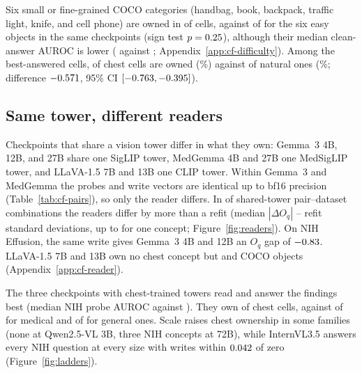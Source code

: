 Six small or fine-grained COCO categories (handbag, book, backpack, traffic light, knife, and cell phone) are owned in \cfFgFineOwned{} of \cfFgFineCells{} cells, against \cfFgEasySameOwned{} of \cfFgEasySameCells{} for the six easy objects in the same checkpoints (sign test $p=0.25$), although their median clean-answer AUROC is lower (\cfFgFineAuroc{} against \cfFgEasySameAuroc{}; Appendix~\ref{app:cf-difficulty}). Among the best-answered cells, \cfStratChestTopOwned{} of \cfStratChestTopN{} chest cells are owned (\cfStratChestTopPct\%) against \cfStratNatTopOwned{} of \cfStratNatTopN{} natural ones (\cfStratNatTopPct\%; difference $-0.571$, 95\% CI $[-0.763,-0.395]$).

\subsection{Same tower, different readers}
\label{sec:reader}

Checkpoints that share a vision tower differ in what they own: Gemma~3 4B, 12B, and 27B share one SigLIP \citep{zhai2023siglip} tower, MedGemma 4B and 27B one MedSigLIP \citep{sellergren2025medgemma} tower, and LLaVA-1.5 7B and 13B one CLIP \citep{radford2021clip} tower. Within Gemma~3 and MedGemma the probes and write vectors are identical up to bf16 precision (Table~\ref{tab:cf-pairs}), so only the reader differs. In \cfPairsRatioAboveOne{} of \cfPairsRatioN{} shared-tower pair--dataset combinations the readers differ by more than a refit (median $|\Delta O_q|$ \cfPairsRatioMin{}--\cfPairsRatioMax{} refit standard deviations, up to \cfPairsRatioSingleMax{} for one concept; Figure~\ref{fig:readers}). On NIH Effusion, the same write gives Gemma~3 4B and 12B an $O_q$ gap of $-0.83$. LLaVA-1.5 7B and 13B own no chest concept but \cfLlavaSevenCoco{} and \cfLlavaThirteenCoco{} COCO objects (Appendix~\ref{app:cf-reader}).

The three checkpoints with chest-trained towers read and answer the findings best (median NIH probe AUROC \cfSpecTowerProbeAuroc{} against \cfSpecRestProbeAuroc{}). They own \cfSpecTowerOwned{} of \cfSpecTowerN{} chest cells, against \cfSpecMedOwned{} of \cfSpecMedN{} for medical and \cfSpecGenOwned{} of \cfSpecGenN{} for general ones. Scale raises chest ownership in some families (none at Qwen2.5-VL 3B, three NIH concepts at 72B), while InternVL3.5 answers every NIH question at every size with writes within $0.042$ of zero (Figure~\ref{fig:ladders}).

